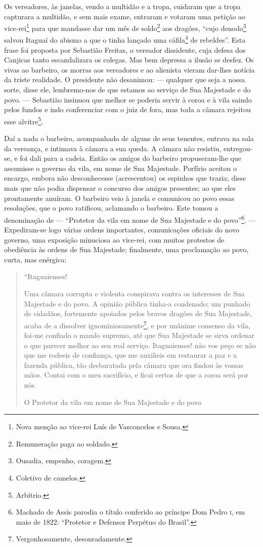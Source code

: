 Os vereadores, às janelas, vendo a multidão e a tropa, cuidaram que a
tropa capturara a multidão, e sem mais exame, entraram e votaram uma
petição ao vice-rei\footnote{Nova menção ao vice-rei Luís de Vasconcelos
  e Sousa.} para que mandasse dar um mês de soldo\footnote{Remuneração
  paga ao soldado.} aos dragões, ``cujo denodo\footnote{Ousadia,
  empenho, coragem.} salvou Itaguaí do abismo a que o tinha lançado uma
cáfila\footnote{Coletivo de camelos.} de rebeldes''. Esta frase foi
proposta por Sebastião Freitas, o vereador dissidente, cuja defesa dos
Canjicas tanto escandalizara os colegas. Mas bem depressa a ilusão se
desfez. Os vivas ao barbeiro, os morras aos vereadores e ao alienista
vieram dar-lhes notícia da triste realidade. O presidente não desanimou:
--- qualquer que seja a nossa sorte, disse ele, lembremo-nos de que
estamos ao serviço de Sua Majestade e do povo. --- Sebastião insinuou
que melhor se poderia servir à coroa e à vila saindo pelos fundos e indo
conferenciar com o juiz de fora, mas toda a câmara rejeitou esse
alvitre\footnote{Arbítrio.}.

Daí a nada o barbeiro, acompanhado de alguns de seus tenentes, entrava
na sala da vereança, e intimava à câmara a sua queda. A câmara não
resistiu, entregou-se, e foi dali para a cadeia. Então os amigos do
barbeiro propuseram-lhe que assumisse o governo da vila, em nome de Sua
Majestade. Porfírio aceitou o encargo, embora não desconhecesse
(acrescentou) os espinhos que trazia; disse mais que não podia dispensar
o concurso dos amigos presentes; ao que eles prontamente anuíram. O
barbeiro veio à janela e comunicou ao povo essas resoluções, que o povo
ratificou, aclamando o barbeiro. Este tomou a denominação de ---
``Protetor da vila em nome de Sua Majestade e do povo''\footnote{Machado
  de Assis parodia o título conferido ao príncipe Dom Pedro \textsc{i}, em maio
  de 1822: ``Protetor e Defensor Perpétuo do Brasil''.}. ---
Expediram-se logo várias ordens importantes, comunicações oficiais do
novo governo, uma exposição minuciosa ao vice-rei, com muitos protestos
de obediência às ordens de Sua Majestade; finalmente, uma proclamação ao
povo, curta, mas enérgica:

\begin{quote}
``Itaguaienses!

Uma câmara corrupta e violenta conspirava contra os interesses de Sua
Majestade e do povo. A opinião pública tinha-a condenado; um punhado de
cidadãos, fortemente apoiados pelos bravos dragões de Sua Majestade,
acaba de a dissolver ignominiosamente\footnote{Vergonhosamente,
  desonradamente.}, e por unânime consenso da vila, foi-me confiado o
mando supremo, até que Sua Majestade se sirva ordenar o que parecer
melhor ao seu real serviço. Itaguaienses! não vos peço se não que me
rodeeis de confiança, que me auxilieis em restaurar a paz e a fazenda
pública, tão desbaratada pela câmara que ora findou às vossas mãos.
Contai com o meu sacrifício, e ficai certos de que a coroa será por nós.

O Protetor da vila em nome de Sua Majestade e do povo
\end{quote}

